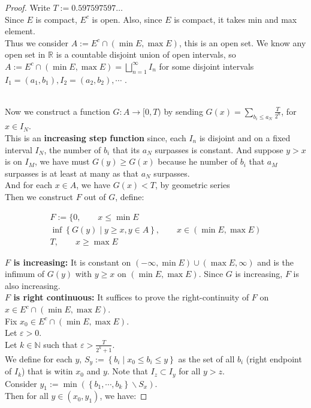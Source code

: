 \begin{proof}

Write \(T := 0.597597597\ldots\)\\
Since \(E\) is compact, \(E^{c}\) is open. Also, since \(E\) is compact, it takes min and max element.\\
Thus we consider \(A := E^{c} \cap (\min E,\max E)\), this is an open set. We know any open set in \(\mathbb{R}\) is a countable disjoint union of open intervals, so \(A := E^{c} \cap (\min E,\max E) = \bigsqcup_{n = 1}^{\infty}I_{n}\) for some disjoint intervals \(I_{1} = (a_{1},b_{1}),I_{2} = (a_{2},b_{2}),\cdots\) .\\
\strut \\
Now we construct a function \(G:A\rightarrow\lbrack 0,T)\) by sending \(G(x) = \sum_{b_{i} \leq a_{N}}\frac{T}{2^{n}}\), for \(x \in I_{N}\).\\
This is an \textbf{increasing step function} since, each \(I_{n}\) is disjoint and on a fixed interval \(I_{N}\), the number of \(b_{i}\) that its \(a_{N}\) surpasses is constant. And suppose \(y > x\) is on \(I_{M}\), we have must \(G(y) \geq G(x)\) because he number of \(b_{i}\) that \(a_{M}\) surpasses is at least at many as that \(a_{N}\) surpasses.\\
And for each \(x \in A\), we have \textbf{\(G(x) < T\)}, by geometric series\\
Then we construct \(F\) out of \(G\), define:

\[\begin{matrix}
{F := \{ 0,\quad\quad x \leq \min E} \\
{\inf\left\{ {G(y) \mid y \geq x,y \in A} \right\},\quad\quad x \in (\min E,\max E)} \\
{T,\quad\quad x \geq \max E}
\end{matrix}\]

\textbf{\(F\) is increasing:} It is constant on \(( - \infty,\min E) \cup (\max E,\infty)\) and is the infimum of \(G(y)\) with \(y \geq x\) on \((\min E,\max E)\). Since \(G\) is increasing, \(F\) is also increasing.\\
\textbf{\(F\) is right continuous:} It suffices to prove the right-continuity of \(F\) on \(x \in E^{c} \cap (\min E,\max E)\).\\
Fix \(x_{0} \in E^{c} \cap (\min E,\max E)\).\\
Let \(\varepsilon > 0\).\\
Let \(k \in \mathbb{N}\) such that \(\varepsilon > \frac{T}{2^{k} + 1}\).\\
We define for each \(y\), \(S_{y} := \left\{ {b_{i} \mid x_{0} \leq b_{i} \leq y} \right\}\) as the set of all \(b_{i}\) (right endpoint of \(I_{k}\)) that is witin \(x_{0}\) and \(y\). Note that \(I_{z} \subset I_{y}\) for all \(y > z\).\\
Consider \(y_{1} := \min(\left\{ {b_{1},\cdots,b_{k}} \right\}\backslash S_{x})\).\\
Then for all \(y \in (x_{0},y_{1})\), we have:


\end{proof}
